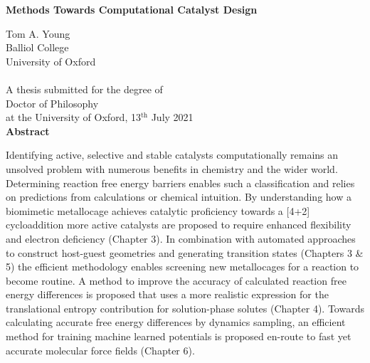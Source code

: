 \documentclass[main.tex]{subfiles}
\begin{document}
	\setcounter{page}{1}
	\begin{center}
		\begin{Large}
    		\null
			\vspace{-0.8cm}
			
			{\bfseries \Large \textsf{Methods Towards Computational Catalyst Design}}\\\vspace{0.3cm}
		\end{Large}
		\vspace{0.5cm}
		Tom A. Young\\
		Balliol College\\
		University of Oxford\\
		\ \\
		A thesis submitted for the degree of\\
		Doctor of Philosophy\\
		at the University of Oxford, 13${}^\text{th}$ July 2021\\
		\vspace{1cm}
		{\bfseries Abstract}
	\end{center}
    \null
    \vspace{-0.9cm}
	Identifying active, selective and stable catalysts computationally remains an unsolved problem with numerous benefits in chemistry and the wider world. Determining reaction free energy barriers enables such a classification and relies on predictions from calculations or chemical intuition. By understanding how a biomimetic metallocage achieves catalytic proficiency towards a [4+2] cycloaddition more active catalysts are proposed to require enhanced flexibility and electron deficiency (Chapter 3). In combination with automated approaches to construct host-guest geometries and generating transition states (Chapters 3 \& 5) the efficient methodology enables screening new metallocages for a reaction to become routine. A method to improve the accuracy of calculated reaction free energy differences is proposed that uses a more realistic expression for the translational entropy contribution for solution-phase solutes (Chapter 4). Towards calculating accurate free energy differences by dynamics sampling, an efficient method for training machine learned potentials is proposed en-route to fast yet accurate molecular force fields (Chapter 6).
	\
	
\end{document}

